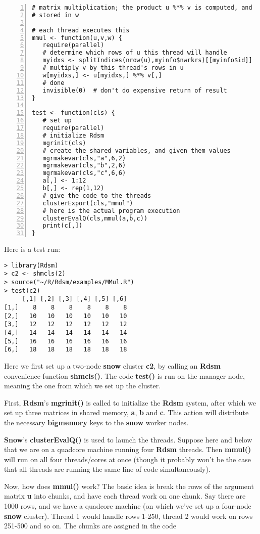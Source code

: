 \documentclass[11pt]{article}
\begin{document}
\begin{lstlisting}[numbers=left]
# matrix multiplication; the product u %*% v is computed, and
# stored in w

# each thread executes this
mmul <- function(u,v,w) {
   require(parallel)
   # determine which rows of u this thread will handle
   myidxs <- splitIndices(nrow(u),myinfo$nwrkrs)[[myinfo$id]]
   # multiply v by this thread's rows in u
   w[myidxs,] <- u[myidxs,] %*% v[,]
   # done
   invisible(0)  # don't do expensive return of result
}

test <- function(cls) {
   # set up
   require(parallel)
   # initialize Rdsm
   mgrinit(cls)
   # create the shared variables, and given them values
   mgrmakevar(cls,"a",6,2)
   mgrmakevar(cls,"b",2,6)
   mgrmakevar(cls,"c",6,6)
   a[,] <- 1:12
   b[,] <- rep(1,12)
   # give the code to the threads
   clusterExport(cls,"mmul")
   # here is the actual program execution
   clusterEvalQ(cls,mmul(a,b,c))
   print(c[,])
}
\end{lstlisting}

Here is a test run:

\begin{lstlisting}
> library(Rdsm)
> c2 <- shmcls(2)
> source("~/R/Rdsm/examples/MMul.R")
> test(c2)
     [,1] [,2] [,3] [,4] [,5] [,6]
[1,]    8    8    8    8    8    8
[2,]   10   10   10   10   10   10
[3,]   12   12   12   12   12   12
[4,]   14   14   14   14   14   14
[5,]   16   16   16   16   16   16
[6,]   18   18   18   18   18   18
\end{lstlisting}

Here we first set up a two-node {\bf snow} cluster {\bf c2}, by calling
an {\bf Rdsm} convenience function {\bf shmcls()}.  The code {\bf
test()} is run on the manager node, meaning the one from which we set
up the cluster.

First, {\bf Rdsm}'s {\bf mgrinit()} is called to initialize the {\bf
Rdsm} system, after which we set up three matrices in shared memory,
{\bf a}, {\bf b} and {\bf c}.  This action will distribute the necessary
{\bf bigmemory} keys to the {\bf snow} worker nodes.

{\bf Snow}'s {\bf clusterEvalQ()} is used to launch the threads.
Suppose here and below that we are on a quadcore machine running four
{\bf Rdsm} threads.  Then {\bf mmul()} will run on all four
threads/cores at once (though it probably won't be the case that all
threads are running the same line of code simultaneously).  

Now, how does {\bf mmul()} work?  The basic idea is break the rows of
the argument matrix {\bf u} into chunks, and have each thread work on
one chunk.  Say there are 1000 rows, and we have a quadcore machine (on
which we've set up a four-node {\bf snow} cluster).  Thread 1 would
handle rows 1-250, thread 2 would work on rows 251-500 and so on.  The
chunks are assigned in the code
\end{document}

